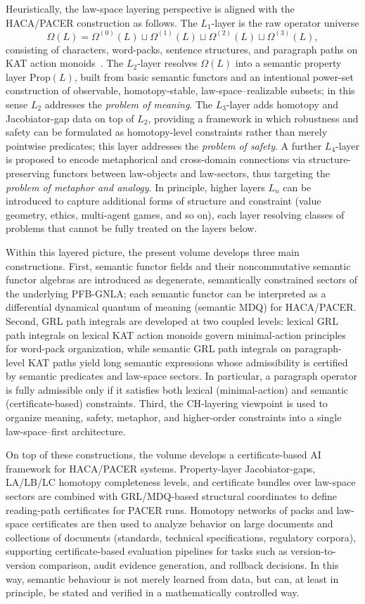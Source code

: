 \documentclass[11pt]{book}
\theoremstyle{plain}
\theoremstyle{definition}
\theoremstyle{remark}
\begin{document}
Heuristically, the law-space layering perspective is aligned with the
HACA/PACER construction as follows. The $L_1$-layer is the raw operator
universe
\[
  \Omega(L)
  =
  \Omega^{(0)}(L)\sqcup\Omega^{(1)}(L)\sqcup\Omega^{(2)}(L)\sqcup\Omega^{(3)}(L),
\]
consisting of characters, word-packs, sentence structures, and paragraph
paths on KAT action monoids~\cite{KozenSmithKAT1996}. The $L_2$-layer resolves $\Omega(L)$ into a
semantic property layer $\mathrm{Prop}(L)$, built from basic semantic
functors and an intentional power-set construction of observable, homotopy-stable,
law-space–realizable subsets; in this sense $L_2$ addresses the \emph{problem
of meaning}. The $L_3$-layer adds homotopy and Jacobiator-gap data on top of
$L_2$, providing a framework in which robustness and safety can be formulated
as homotopy-level constraints rather than merely pointwise predicates; this
layer addresses the \emph{problem of safety}. A further $L_4$-layer is
proposed to encode metaphorical and cross-domain connections via
structure-preserving functors between law-objects and law-sectors, thus
targeting the \emph{problem of metaphor and analogy}. In principle, higher
layers $L_n$ can be introduced to capture additional forms of structure and
constraint (value geometry, ethics, multi-agent games, and so on), each
layer resolving classes of problems that cannot be fully treated on the
layers below.

Within this layered picture, the present volume develops three main
constructions. First, semantic functor fields and their noncommutative
semantic functor algebras are introduced as degenerate, semantically
constrained sectors of the underlying PFB-GNLA; each semantic functor can
be interpreted as a differential dynamical quantum of meaning (semantic MDQ)
for HACA/PACER. Second, GRL path integrals are developed at two coupled
levels: lexical GRL path integrals on lexical KAT action monoids govern
minimal-action principles for word-pack organization, while semantic GRL
path integrals on paragraph-level KAT paths yield long semantic expressions
whose admissibility is certified by semantic predicates and law-space
sectors. In particular, a paragraph operator is fully admissible only if it
satisfies both lexical (minimal-action) and semantic (certificate-based)
constraints. Third, the CH-layering viewpoint is used to organize meaning,
safety, metaphor, and higher-order constraints into a single law-space–first
architecture.

On top of these constructions, the volume develops a certificate-based AI
framework for HACA/PACER systems. Property-layer Jacobiator-gaps, LA/LB/LC
homotopy completeness levels, and certificate bundles over law-space sectors
are combined with GRL/MDQ-based structural coordinates to define reading-path
certificates for PACER runs. Homotopy networks of packs and law-space
certificates are then used to analyze behavior on large documents and
collections of documents (standards, technical specifications, regulatory
corpora), supporting certificate-based evaluation pipelines for tasks such as
version-to-version comparison, audit evidence generation, and rollback
decisions. In this way, semantic behaviour is not merely learned from data,
but can, at least in principle, be stated and verified in a mathematically
controlled way.
\end{document}
